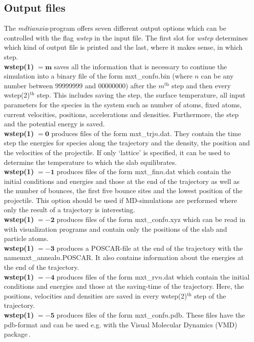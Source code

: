 \documentclass[twoside, 11pt, titlepage, captions=nooneline, a4paper, headsepline]{scrbook}%
\newcommand{\9}{\mathrm}
\newcommand{\0}{\,\mathrm}
\begin{document}
\subsection{Output files}
\label{Sec:mxt:output}
The \textit{mdtianxia}-program offers seven different output options which can be controlled with the flag \textit{wstep} in the input file. The first slot for \textit{wstep} determines which kind of output file is printed and the last, where it makes sense, in which step.
\\
\textbf{wstep(1)} $\mathbf{=m}$ saves all the information that is necessary to continue the simulation into a binary file of the form mxt\_conf$n$.bin (where $n$ can be any number between 99999999 and 00000000) after the $m^\mathrm{th}$ step and then every wstep(2)$^\mathrm{th}$ step. This includes saving the step, the surface temperature, all input parameters for the species in the system such as number of atoms, fixed atoms, current velocities, positions, accelerations and densities. Furthermore, the step and the potential energy is saved.\\
\textbf{wstep(1)} $\mathbf{=0}$ produces files of the form mxt\_trj$n$.dat. They contain the time step the energies for species along the trajectory and the density, the position and the velocities of the projectile. If only `lattice' is specified, it can be used to determine the temperature to which the slab equilibrates.\\
\textbf{wstep(1)} $\mathbf{=-1}$ produces files of the form mxt\_fin$n$.dat which contain the initial conditions and energies and those at the end of the trajectory as well as the number of bounces, the first five bounce sites and the lowest position of the projectile. This option should be used if MD-simulations are performed where only the result of a trajectory is interesting.\\ 
\textbf{wstep(1)} $\mathbf{=-2}$ produces files of the form mxt\_conf$n$.xyz which can be read in with visualization programs and contain only the positions of the slab and particle atoms.\\
\textbf{wstep(1)} $\mathbf{=-3}$ produces a POSCAR-file at the end of the trajectory with the name\linebreak mxt\_anneal$n$.POSCAR. It also contains information about the energies at the end of the trajectory.\\
\textbf{wstep(1)} $\mathbf{=-4}$ produces files of the form mxt\_rv$n$.dat which contain the initial conditions and energies and those at the saving-time of the trajectory. Here, the positions, velocities and densities are saved in every wstep(2)$^\mathrm{th}$ step of the trajectory.\\
\textbf{wstep(1)} $\mathbf{=-5}$ produces files of the form mxt\_conf$n$.pdb. These files have the pdb-format and can be used e.g. with the Visual Molecular Dynamics (VMD) package\,\cite{humphrey1996}.
\end{document}

